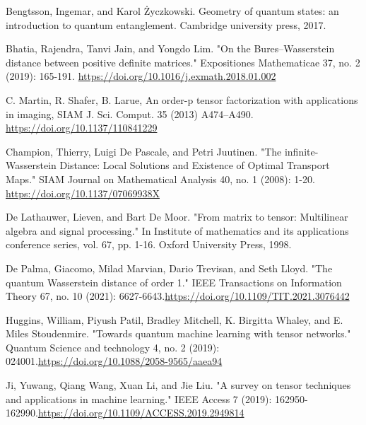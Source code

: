 \documentclass[oupthm]{CUP-JNL-BCM}%
\theoremstyle{oupplain}
\theoremstyle{oupdefinition}
\theoremstyle{oupremark}
\theoremstyle{oupproof}
\numberwithin{equation}{section}
\begin{document}
\begin{Backmatter}


\begin{thebibliography}{}

Bengtsson, Ingemar, and Karol Życzkowski. Geometry of quantum states: an introduction to quantum entanglement. Cambridge university press, 2017.

Bhatia, Rajendra, Tanvi Jain, and Yongdo Lim. "On the Bures–Wasserstein distance between positive definite matrices." Expositiones Mathematicae 37, no. 2 (2019): 165-191. \url{https://doi.org/10.1016/j.exmath.2018.01.002}

C. Martin, R. Shafer, B. Larue, An order-p tensor factorization with applications in imaging, SIAM
J. Sci. Comput. 35 (2013) A474–A490. \url{https://doi.org/10.1137/110841229}

Champion, Thierry, Luigi De Pascale, and Petri Juutinen. "The infinite-Wasserstein Distance: Local Solutions and Existence of Optimal Transport Maps." SIAM Journal on Mathematical Analysis 40, no. 1 (2008): 1-20. \url{https://doi.org/10.1137/07069938X}

De Lathauwer, Lieven, and Bart De Moor. "From matrix to tensor: Multilinear algebra and signal processing." In Institute of mathematics and its applications conference series, vol. 67, pp. 1-16. Oxford University Press, 1998.

De Palma, Giacomo, Milad Marvian, Dario Trevisan, and Seth Lloyd. "The quantum Wasserstein distance of order 1." IEEE Transactions on Information Theory 67, no. 10 (2021): 6627-6643.\url{https://doi.org/10.1109/TIT.2021.3076442}


Huggins, William, Piyush Patil, Bradley Mitchell, K. Birgitta Whaley, and E. Miles Stoudenmire. "Towards quantum machine learning with tensor networks." Quantum Science and technology 4, no. 2 (2019): 024001.\url{https://doi.org/10.1088/2058-9565/aaea94}

Ji, Yuwang, Qiang Wang, Xuan Li, and Jie Liu. "A survey on tensor techniques and applications in machine learning." IEEE Access 7 (2019): 162950-162990.\url{https://doi.org/10.1109/ACCESS.2019.2949814}


\end{thebibliography}
\end{Backmatter}
\end{document}

